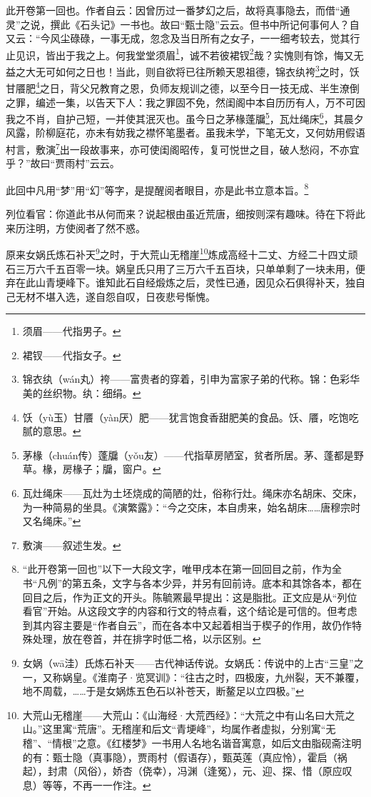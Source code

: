 \par 此开卷第一回也。作者自云：因曾历过一番梦幻之后，故将真事隐去，而借“通灵”之说，撰此《石头记》一书也。故曰“甄士隐”云云。但书中所记何事何人？自又云：“今风尘碌碌，一事无成，忽念及当日所有之女子，一一细考较去，觉其行止见识，皆出于我之上。何我堂堂须眉\footnote{须眉——代指男子。}，诚不若彼裙钗\footnote{裙钗——代指女子。}哉？实愧则有馀，悔又无益之大无可如何之日也！当此，则自欲将已往所赖天恩祖德，锦衣纨袴\footnote{锦衣纨（wán丸）袴——富贵者的穿着，引申为富家子弟的代称。锦：色彩华美的丝织物。纨：细绢。}之时，饫甘餍肥\footnote{饫（yù玉）甘餍（yàn厌）肥——犹言饱食香甜肥美的食品。饫、餍，吃饱吃腻的意思。}之日，背父兄教育之恩，负师友规训之德，以至今日一技无成、半生潦倒之罪，编述一集，以告天下人：我之罪固不免，然闺阁中本自历历有人，万不可因我之不肖，自护己短，一并使其泯灭也。虽今日之茅椽蓬牖\footnote{茅椽（chuán传）蓬牖（yǒu友）——代指草房陋室，贫者所居。茅、蓬都是野草。椽，房椽子；牖，窗户。}，瓦灶绳床\footnote{瓦灶绳床——瓦灶为土坯烧成的简陋的灶，俗称行灶。绳床亦名胡床、交床，为一种简易的坐具。《演繁露》：“今之交床，本自虏来，始名胡床……唐穆宗时又名绳床。”}，其晨夕风露，阶柳庭花，亦未有妨我之襟怀笔墨者。虽我未学，下笔无文，又何妨用假语村言，敷演\footnote{敷演——叙述生发。}出一段故事来，亦可使闺阁昭传，复可悦世之目，破人愁闷，不亦宜乎？”故曰“贾雨村”云云。
\par 此回中凡用“梦”用“幻”等字，是提醒阅者眼目，亦是此书立意本旨。\footnote{“此开卷第一回也”以下一大段文字，唯甲戌本在第一回回目之前，作为全书“凡例”的第五条，文字与各本少异，并另有回前诗。底本和其馀各本，都在回目之后，作为正文的开头。陈毓罴最早提出：这是脂批。正文应是从“列位看官”开始。从这段文字的内容和行文的特点看，这个结论是可信的。但考虑到其内容主要是“作者自云”，而在各本中又起着相当于楔子的作用，故仍作特殊处理，放在卷首，并在排字时低二格，以示区别。}
\par 列位看官：你道此书从何而来？说起根由虽近荒唐，细按则深有趣味。待在下将此来历注明，方使阅者了然不惑。
\par 原来女娲氏炼石补天\footnote{女娲（wā洼）氏炼石补天——古代神话传说。女娲氏：传说中的上古“三皇”之一，又称娲皇。《淮南子·览冥训》：“往古之时，四极废，九州裂，天不兼覆，地不周载，……于是女娲炼五色石以补苍天，断鳌足以立四极。”}之时，于大荒山无稽崖\footnote{大荒山无稽崖——大荒山：《山海经·大荒西经》：“大荒之中有山名曰大荒之山。”这里寓“荒唐”。无稽崖和后文“青埂峰”，均属作者虚拟，分别寓“无稽”、“情根”之意。《红楼梦》一书用人名地名谐音寓意，如后文由脂砚斋注明的有：甄士隐（真事隐），贾雨村（假语存），甄英莲（真应怜），霍启（祸起），封肃（风俗），娇杏（侥幸），冯渊（逢冤），元、迎、探、惜（原应叹息）等等，不再一一作注。}炼成高经十二丈、方经二十四丈顽石三万六千五百零一块。娲皇氏只用了三万六千五百块，只单单剩了一块未用，便弃在此山青埂峰下。谁知此石自经煅炼之后，灵性已通，因见众石俱得补天，独自己无材不堪入选，遂自怨自叹，日夜悲号惭愧。
